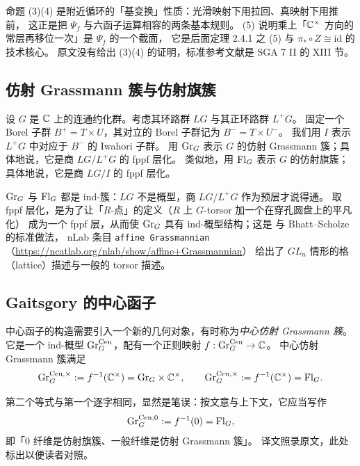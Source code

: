 \begin{yizhu}
命题 (3)(4) 是附近循环的「基变换」性质：光滑映射下用拉回、真映射下用推前，
这正是把 $\Psi_f$ 与六函子运算相容的两条基本规则。
(5) 说明乘上「$\mathbb{C}^{\times}$ 方向的常层再移位一次」是 $\Psi_f$ 的一个截面，
它是后面定理 2.4.1 之 (5) 与 $\pi_*\circ Z\cong\mathrm{id}$ 的技术核心。
原文没有给出 (3)(4) 的证明，标准参考文献是 SGA 7 II 的 XIII 节。
\end{yizhu}

\subsection{仿射 Grassmann 簇与仿射旗簇}\label{sec:gr}

设 $G$ 是 $\mathbb{C}$ 上的连通约化群。考虑其环路群 $LG$ 与其正环路群 $L^+G$。
固定一个 Borel 子群 $B^+=T\times U$，其对立的 Borel 子群记为 $B^-=T\times U^-$。
我们用 $I$ 表示 $L^+G$ 中对应于 $B^-$ 的 Iwahori 子群。
用 $\mathrm{Gr}_G$ 表示 $G$ 的仿射 Grassmann 簇；具体地说，它是商 $LG/L^+G$ 的 fppf 层化。
类似地，用 $\mathrm{Fl}_G$ 表示 $G$ 的仿射旗簇；具体地说，它是商 $LG/I$ 的 fppf 层化。

\begin{yizhu}
$\mathrm{Gr}_G$ 与 $\mathrm{Fl}_G$ 都是 ind-簇：$LG$ 不是概型，商 $LG/L^+G$ 作为预层才说得通。
取 fppf 层化，是为了让「$R$-点」的定义（$R$ 上 $G$-torsor 加一个在穿孔圆盘上的平凡化）
成为一个 fppf 层，从而使 $\mathrm{Gr}_G$ 具有 ind-概型结构；这是 \cite{Zhu} 与 Bhatt–Scholze 的标准做法，
nLab 条目 \texttt{affine Grassmannian}（\url{https://ncatlab.org/nlab/show/affine+Grassmannian}）
给出了 $GL_n$ 情形的格（lattice）描述与一般的 torsor 描述。
\end{yizhu}

\subsection{Gaitsgory 的中心函子}\label{sec:central}

中心函子的构造需要引入一个新的几何对象，有时称为\emph{中心仿射 Grassmann 簇}。
它是一个 ind-概型 $\mathrm{Gr}_G^{\mathrm{Cen}}$，配有一个正则映射 $f:\mathrm{Gr}_G^{\mathrm{Cen}}\to\mathbb{C}$。
中心仿射 Grassmann 簇满足
\[
\mathrm{Gr}_G^{\mathrm{Cen},\times}:=f^{-1}(\mathbb{C}^{\times})=\mathrm{Gr}_G\times\mathbb{C}^{\times},
\qquad
\mathrm{Gr}_G^{\mathrm{Cen},\times}:=f^{-1}(\mathbb{C}^{\times})=\mathrm{Fl}_G .
\]

\begin{yizhu}[原文疑误]
第二个等式与第一个逐字相同，显然是笔误：按文意与上下文，它应当写作
\[
\mathrm{Gr}_G^{\mathrm{Cen},0}:=f^{-1}(0)=\mathrm{Fl}_G ,
\]
即「$0$ 纤维是仿射旗簇、一般纤维是仿射 Grassmann 簇」。
译文照录原文，此处标出以便读者对照。
\end{yizhu}

